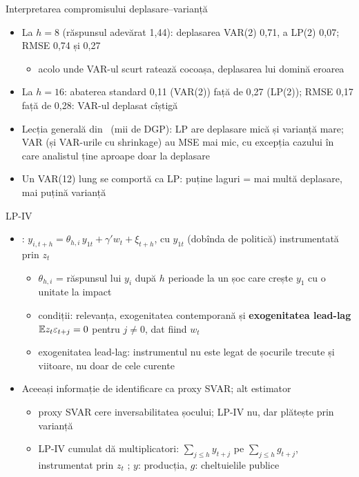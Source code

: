 \begin{frame}{Interpretarea compromisului deplasare--varianță}
\itemsize{\small}
\begin{itemize}
    \item La $h = 8$ (răspunsul adevărat 1{,}44): deplasarea VAR(2) 0{,}71, a LP(2) 0{,}07; RMSE 0{,}74 și 0{,}27
    \begin{itemize}
        \item acolo unde VAR-ul scurt ratează cocoașa, deplasarea lui domină eroarea
    \end{itemize}
    \item La $h = 16$: abaterea standard 0{,}11 (VAR(2)) față de 0{,}27 (LP(2)); RMSE 0{,}17 față de 0{,}28: VAR-ul deplasat cîștigă
    \item Lecția generală din \ (mii de DGP): LP are deplasare mică și varianță mare; VAR (și VAR-urile cu shrinkage) au MSE mai mic, cu excepția cazului în care analistul ține aproape doar la deplasare
    \item Un VAR(12) lung se comportă ca LP: puține laguri = mai multă deplasare, mai puțină varianță
\end{itemize}
\end{frame}

\begin{frame}{LP-IV}
\itemsize{\small}
\begin{itemize}
    \item {}: $y_{i,t+h} = \theta_{h,i}\,y_{1t} + \gamma'w_t + \xi_{t+h}$, cu $y_{1t}$ (dobînda de politică) instrumentată prin $z_t$
    \begin{itemize}
        \item $\theta_{h,i}$ = răspunsul lui $y_i$ după $h$ perioade la un șoc care crește $y_1$ cu o unitate la impact
        \item condiții: relevanța, exogenitatea contemporană și \textbf{exogenitatea lead-lag} $\mathbb{E} z_t\varepsilon_{t+j} = 0$ pentru $j \ne 0$, dat fiind $w_t$
        \item exogenitatea lead-lag: instrumentul nu este legat de șocurile trecute și viitoare, nu doar de cele curente
    \end{itemize}
    \item Aceeași informație de identificare ca proxy SVAR; alt estimator
    \begin{itemize}
        \item proxy SVAR cere inversabilitatea șocului; LP-IV nu, dar plătește prin varianță
        \item LP-IV cumulat dă multiplicatori: $\sum_{j\le h}y_{t+j}$ pe $\sum_{j\le h}g_{t+j}$, instrumentat prin $z_t$ ; $y$: producția, $g$: cheltuielile publice
    \end{itemize}
\end{itemize}
\end{frame}

